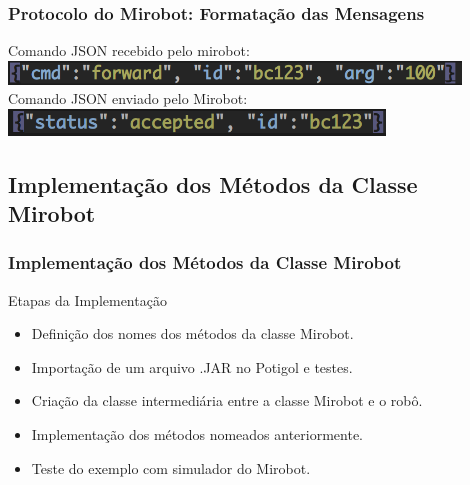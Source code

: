 \documentclass{beamer}
\begin{document}
\begin{frame}
   \frametitle{Protocolo do Mirobot: Formatação das Mensagens}

   \begin{center}
     Comando JSON recebido pelo mirobot:
     \includegraphics[width=12cm]{imagens/json1.png} \\

     Comando JSON enviado pelo Mirobot:
     \includegraphics[width=10cm]{imagens/json2.png}
   \end{center}

\end{frame}

\begin{frame}
  \subsection{Implementação dos Métodos da Classe Mirobot}
  \label{implementacao}
  \frametitle{Implementação dos Métodos da Classe Mirobot}

  \begin{block}{Etapas da Implementação}
    \begin{itemize}
    \item Definição dos nomes dos métodos da classe Mirobot.
    \item Importação de um arquivo .JAR no Potigol e testes.
    \item Criação da classe intermediária entre a classe Mirobot e o robô.
    \item Implementação dos métodos nomeados anteriormente.
    \item Teste do exemplo com simulador do Mirobot.
    \end{itemize}
  \end{block}
\end{frame}
\end{document}
